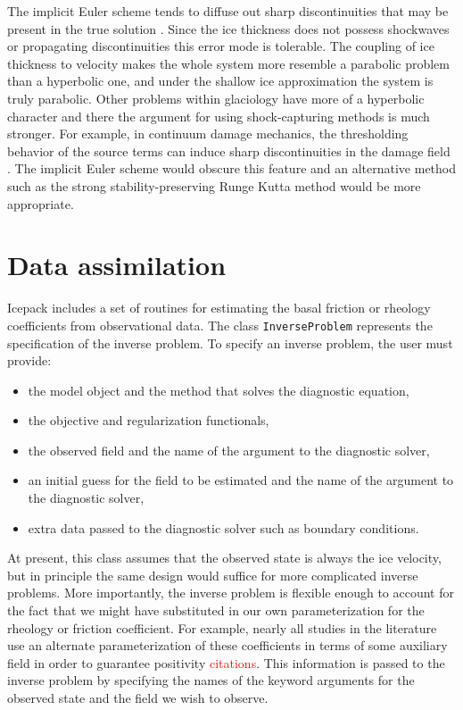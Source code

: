 \documentclass{article}
\theoremstyle{definition}
\theoremstyle{plain}
\begin{document}
The implicit Euler scheme tends to diffuse out sharp discontinuities that may be present in the true solution \citep{donea2003finite}.
Since the ice thickness does not possess shockwaves or propagating discontinuities this error mode is tolerable.
The coupling of ice thickness to velocity makes the whole system more resemble a parabolic problem than a hyperbolic one, and under the shallow ice approximation the system is truly parabolic.
Other problems within glaciology have more of a hyperbolic character and there the argument for using shock-capturing methods is much stronger.
For example, in continuum damage mechanics, the thresholding behavior of the source terms can induce sharp discontinuities in the damage field \citep{albrecht2014fracture}.
The implicit Euler scheme would obscure this feature and an alternative method such as the strong stability-preserving Runge Kutta method would be more appropriate.


\section{Data assimilation}

Icepack includes a set of routines for estimating the basal friction or rheology coefficients from observational data.
The class \texttt{InverseProblem} represents the specification of the inverse problem.
To specify an inverse problem, the user must provide:
\begin{itemize}
    \item the model object and the method that solves the diagnostic equation,
    \item the objective and regularization functionals,
    \item the observed field and the name of the argument to the diagnostic solver,
    \item an initial guess for the field to be estimated and the name of the argument to the diagnostic solver,
    \item extra data passed to the diagnostic solver such as boundary conditions.
\end{itemize}
At present, this class assumes that the observed state is always the ice velocity, but in principle the same design would suffice for more complicated inverse problems.
More importantly, the inverse problem is flexible enough to account for the fact that we might have substituted in our own parameterization for the rheology or friction coefficient.
For example, nearly all studies in the literature use an alternate parameterization of these coefficients in terms of some auxiliary field in order to guarantee positivity \textcolor{red}{citations}.
This information is passed to the inverse problem by specifying the names of the keyword arguments for the observed state and the field we wish to observe.
\end{document}
